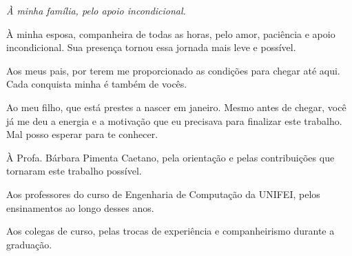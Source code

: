 \documentclass[
	12pt,				%
	twoside,			%
	a4paper,			%
	english,			%
	french,				%
	spanish,			%
	brazil				%
	]{abntex2}
\begin{document}

\frenchspacing

\imprimircapa
\imprimirfolhaderosto*

\begin{dedicatoria}
   \vspace*{\fill}
   \centering
   \noindent
   \textit{À minha família, pelo apoio incondicional.} \vspace*{\fill}
\end{dedicatoria}

\begin{agradecimentos}
À minha esposa, companheira de todas as horas, pelo amor, paciência e apoio incondicional. Sua presença tornou essa jornada mais leve e possível.

Aos meus pais, por terem me proporcionado as condições para chegar até aqui. Cada conquista minha é também de vocês.

Ao meu filho, que está prestes a nascer em janeiro. Mesmo antes de chegar, você já me deu a energia e a motivação que eu precisava para finalizar este trabalho. Mal posso esperar para te conhecer.

À Profa. Bárbara Pimenta Caetano, pela orientação e pelas contribuições que tornaram este trabalho possível.

Aos professores do curso de Engenharia de Computação da UNIFEI, pelos ensinamentos ao longo desses anos.

Aos colegas de curso, pelas trocas de experiência e companheirismo durante a graduação.
\end{agradecimentos}


\end{document}
